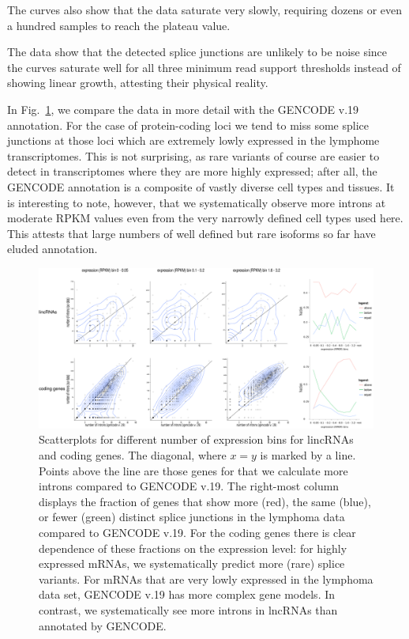 \documentclass[ncrna,article,submit,moreauthors,pdftex,10pt,a4paper]{mdpi}
\begin{document}
The curves also show that the data saturate very slowly, requiring dozens
or even a hundred samples to reach the plateau value. 

The data show that the detected splice junctions are unlikely to be noise since the curves saturate well for all three minimum read support thresholds instead of showing linear growth, attesting their physical reality.

In Fig.~\ref{fig:compare}, we compare the data in more detail with the
GENCODE v.19 annotation. For the case of protein-coding loci we tend to
miss some splice junctions at those loci which are extremely lowly expressed in
the lymphome transcriptomes. This is not surprising, as rare variants of
course are easier to detect in transcriptomes where they are more highly
expressed; after all, the GENCODE annotation is a composite of vastly
diverse cell types and tissues. It is interesting to note, however, that we
systematically observe more introns at moderate RPKM values even from the
very narrowly defined cell types used here. This attests that large numbers
of well defined but rare isoforms so far have eluded annotation.

\begin{figure}[t]
  \begin{center}
    \includegraphics[width=\textwidth]{Fig1}
  \end{center}
  \caption{Scatterplots for different number of expression bins for
    lincRNAs and coding genes.  The diagonal, where $x=y$ is marked by a
    line. Points above the line are those genes for that we calculate more
    introns compared to GENCODE v.19.  The right-most column displays the
    fraction of genes that show more (red), the same (blue), or fewer
    (green) distinct splice junctions in the lymphoma data compared to
    GENCODE v.19.  For the coding genes there is clear dependence of these
    fractions on the expression level: for highly expressed mRNAs, we
    systematically predict more (rare) splice variants. For mRNAs that are
    very lowly expressed in the lymphoma data set, GENCODE v.19 has more
    complex gene models. In contrast, we systematically see more introns in
    lncRNAs than annotated by GENCODE.}
  \label{fig:compare}
\end{figure}
\end{document}
